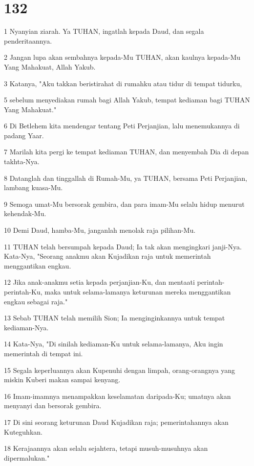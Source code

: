 \chapter{132}

\par 1 Nyanyian ziarah. Ya TUHAN, ingatlah kepada Daud, dan segala penderitaannya.
\par 2 Jangan lupa akan sembahnya kepada-Mu TUHAN, akan kaulnya kepada-Mu Yang Mahakuat, Allah Yakub.
\par 3 Katanya, "Aku takkan beristirahat di rumahku atau tidur di tempat tidurku,
\par 5 sebelum menyediakan rumah bagi Allah Yakub, tempat kediaman bagi TUHAN Yang Mahakuat."
\par 6 Di Betlehem kita mendengar tentang Peti Perjanjian, lalu menemukannya di padang Yaar.
\par 7 Marilah kita pergi ke tempat kediaman TUHAN, dan menyembah Dia di depan takhta-Nya.
\par 8 Datanglah dan tinggallah di Rumah-Mu, ya TUHAN, bersama Peti Perjanjian, lambang kuasa-Mu.
\par 9 Semoga umat-Mu bersorak gembira, dan para imam-Mu selalu hidup menurut kehendak-Mu.
\par 10 Demi Daud, hamba-Mu, janganlah menolak raja pilihan-Mu.
\par 11 TUHAN telah bersumpah kepada Daud; Ia tak akan mengingkari janji-Nya. Kata-Nya, "Seorang anakmu akan Kujadikan raja untuk memerintah menggantikan engkau.
\par 12 Jika anak-anakmu setia kepada perjanjian-Ku, dan mentaati perintah-perintah-Ku, maka untuk selama-lamanya keturunan mereka menggantikan engkau sebagai raja."
\par 13 Sebab TUHAN telah memilih Sion; Ia menginginkannya untuk tempat kediaman-Nya.
\par 14 Kata-Nya, "Di sinilah kediaman-Ku untuk selama-lamanya, Aku ingin memerintah di tempat ini.
\par 15 Segala keperluannya akan Kupenuhi dengan limpah, orang-orangnya yang miskin Kuberi makan sampai kenyang.
\par 16 Imam-imamnya menampakkan keselamatan daripada-Ku; umatnya akan menyanyi dan bersorak gembira.
\par 17 Di sini seorang keturunan Daud Kujadikan raja; pemerintahannya akan Kuteguhkan.
\par 18 Kerajaannya akan selalu sejahtera, tetapi musuh-musuhnya akan dipermalukan."

